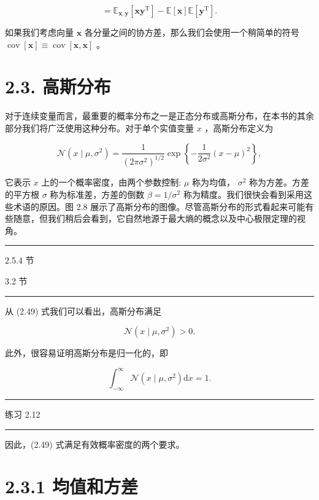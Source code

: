 \documentclass[10pt]{report}
\newcommand{\HRule}{\begin{center}\rule{0.9\linewidth}{0.2mm}\end{center}}
\begin{document}
\[
= {\mathbb{E}}_{\mathbf{x},\mathbf{y}}\left\lbrack  {\mathbf{{xy}}}^{\mathrm{T}}\right\rbrack   - \mathbb{E}\left\lbrack  \mathbf{x}\right\rbrack  \mathbb{E}\left\lbrack  {\mathbf{y}}^{\mathrm{T}}\right\rbrack  . \tag{2.48}
\]

如果我们考虑向量 \(\mathbf{x}\) 各分量之间的协方差，那么我们会使用一个稍简单的符号 \(\operatorname{cov}\left\lbrack  \mathbf{x}\right\rbrack   \equiv  \operatorname{cov}\left\lbrack  {\mathbf{x},\mathbf{x}}\right\rbrack\) 。

\section*{2.3. 高斯分布}

对于连续变量而言，最重要的概率分布之一是正态分布或高斯分布，在本书的其余部分我们将广泛使用这种分布。对于单个实值变量 \(x\) ，高斯分布定义为

\[
\mathcal{N}\left( {x \mid  \mu ,{\sigma }^{2}}\right)  = \frac{1}{{\left( 2\pi {\sigma }^{2}\right) }^{1/2}}\exp \left\{  {-\frac{1}{2{\sigma }^{2}}{\left( x - \mu \right) }^{2}}\right\}  , \tag{2.49}
\]

它表示 \(x\) 上的一个概率密度，由两个参数控制: \(\mu\) 称为均值， \({\sigma }^{2}\) 称为方差。方差的平方根 \(\sigma\) 称为标准差，方差的倒数 \(\beta  = 1/{\sigma }^{2}\) 称为精度。我们很快会看到采用这些术语的原因。图 2.8 展示了高斯分布的图像。尽管高斯分布的形式看起来可能有些随意，但我们稍后会看到，它自然地源于最大熵的概念以及中心极限定理的视角。

\HRule

2.5.4 节

3.2 节

\HRule

从 (2.49) 式我们可以看出，高斯分布满足

\[
\mathcal{N}\left( {x \mid  \mu ,{\sigma }^{2}}\right)  > 0. \tag{2.50}
\]

此外，很容易证明高斯分布是归一化的，即

\[
{\int }_{-\infty }^{\infty }\mathcal{N}\left( {x \mid  \mu ,{\sigma }^{2}}\right) \mathrm{d}x = 1. \tag{2.51}
\]

\HRule

练习 2.12

\HRule

因此，(2.49) 式满足有效概率密度的两个要求。

\section*{2.3.1 均值和方差}
\end{document}
